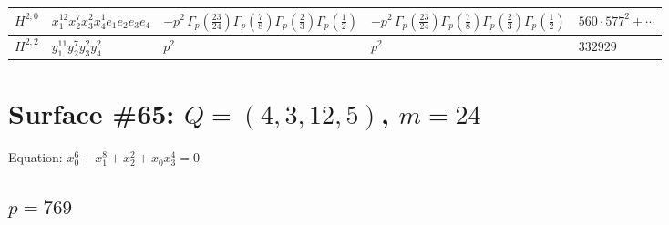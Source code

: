 \documentclass[11pt]{article}
\begin{document}
\begin{table}[ht]
{\begin{tabular}{@{}lllll@{}}
\midrule
$H^{2,0}$ & $x_{1}^{12} x_{2}^{7} x_{3}^{2} x_{4}^{1}  e_{1} e_{2} e_{3} e_{4}$ & $- p^{2} \, \Gamma_p \left( \frac{23}{24} \right) \Gamma_p \left( \frac{7}{8} \right) \Gamma_p \left( \frac{2}{3} \right) \Gamma_p \left( \frac{1}{2} \right)$ & $- p^{2} \, \Gamma_p \left( \frac{23}{24} \right) \Gamma_p \left( \frac{7}{8} \right) \Gamma_p \left( \frac{2}{3} \right) \Gamma_p \left( \frac{1}{2} \right)$ & $560{\cdot}577^{2}{+}\cdots$ \\
\midrule
$H^{2,2}$ & $y_{1}^{11} y_{2}^{7} y_{3}^{2} y_{4}^{2}$ & $p^{2} \,$ & $p^{2} \,$ & $332929$ \\
\bottomrule
\end{tabular}
}
\renewcommand{\arraystretch}{1.0}
\end{table}

\newpage

\section*{Surface \#65: $Q=(4, 3, 12, 5)$, $m=24$}

Equation: $x_0^{6} + x_1^{8} + x_2^{2} + x_0 x_3^{4} = 0$

\subsection*{$p = 769$}
\end{document}
